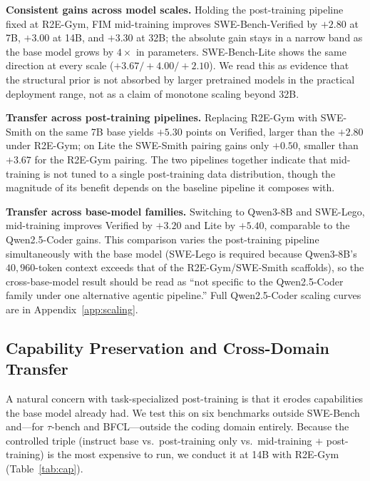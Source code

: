 \textbf{Consistent gains across model scales.}
Holding the post-training pipeline fixed at R2E-Gym, FIM mid-training
improves SWE-Bench-Verified by $+2.80$ at 7B, $+3.00$ at 14B, and
$+3.30$ at 32B; the absolute gain stays in a narrow band as the base
model grows by $4{\times}$ in parameters. SWE-Bench-Lite shows the same
direction at every scale ($+3.67/+4.00/+2.10$). We read this as evidence
that the structural prior is not absorbed by larger pretrained models in
the practical deployment range, not as a claim of monotone scaling
beyond 32B.

\textbf{Transfer across post-training pipelines.}
Replacing R2E-Gym with SWE-Smith on the same 7B base yields $+5.30$
points on Verified, larger than the $+2.80$ under R2E-Gym; on Lite the
SWE-Smith pairing gains only $+0.50$, smaller than $+3.67$ for the
R2E-Gym pairing. The two pipelines together indicate that mid-training
is not tuned to a single post-training data distribution, though the
magnitude of its benefit depends on the baseline pipeline it composes
with.

\textbf{Transfer across base-model families.}
Switching to Qwen3-8B and SWE-Lego, mid-training improves Verified by
$+3.20$ and Lite by $+5.40$, comparable to the Qwen2.5-Coder gains. This
comparison varies the post-training pipeline simultaneously with the
base model (SWE-Lego is required because Qwen3-8B's $40{,}960$-token
context exceeds that of the R2E-Gym/SWE-Smith scaffolds), so the
cross-base-model result should be read as ``not specific to the
Qwen2.5-Coder family under one alternative agentic pipeline.'' Full
Qwen2.5-Coder scaling curves are in Appendix~\ref{app:scaling}.

\vspace{-0.5ex}
\subsection{Capability Preservation and Cross-Domain Transfer}
\label{sec:exp:gen}

A natural concern with task-specialized post-training is that it erodes
capabilities the base model already had. We test this on six benchmarks
outside SWE-Bench and---for $\tau$-bench and BFCL---outside the coding
domain entirely. Because the controlled triple (instruct base vs.\
post-training only vs.\ mid-training $+$ post-training) is the most
expensive to run, we conduct it at 14B with R2E-Gym
(Table~\ref{tab:cap}).

